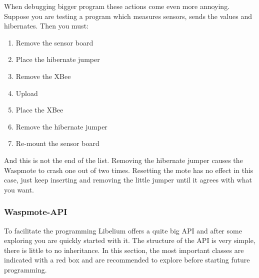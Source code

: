 When debugging bigger program these actions come even more annoying. Suppose you are testing a program which measures sensors, sends the values and hibernates. Then you must:
\begin{enumerate}
\item Remove the sensor board
\item Place the hibernate jumper
\item Remove the XBee
\item Upload
\item Place the XBee
\item Remove the hibernate jumper
\item Re-mount the sensor board
\end{enumerate}
And this is not the end of the list. Removing the hibernate jumper causes the Waspmote to crash one out of two times. Resetting the mote has no effect in this case, just keep inserting and removing the little jumper until it agrees with what you want.
\subsubsection{Waspmote-API}
\label{LibAPI}
To facilitate the programming Libelium offers a quite big API and after some exploring you are quickly started with it. The structure of the API is very simple, there is little to no inheritance. In this section, the most important classes are indicated with a red box and are recommended to explore before starting future programming.
